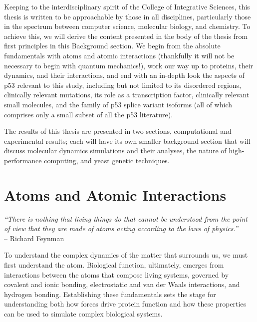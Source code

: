 Keeping to the interdisciplinary spirit of the College of Integrative Sciences, this thesis is written to be approachable by those in all disciplines, particularly those in the spectrum between computer science, molecular biology, and chemistry. To achieve this, we will derive the content presented in the body of the thesis from first principles in this Background section. We begin from the absolute fundamentals with atoms and atomic interactions (thankfully it will not be necessary to begin with quantum mechanics!), work our way up to proteins, their dynamics, and their interactions, and end with an in-depth look the aspects of p53 relevant to this study, including but not limited to its disordered regions, clinically relevant mutations, its role as a transcription factor, clinically relevant small molecules, and the family of p53 splice variant isoforms (all of which comprises only a small subset of all the p53 literature).

The results of this thesis are presented in two sections, computational and experimental results; each will have its own smaller background section that will discuss molecular dynamics simulations and their analyses, the nature of high-performance computing, and yeast genetic techniques.

\section{Atoms and Atomic Interactions}

\begin{flushright}
	\textit{“There is nothing that living things do that cannot be understood from the point of view that they are made of atoms acting according to the laws of physics.”}\\
– Richard Feynman\\
\hfill\break
\end{flushright}

To understand the complex dynamics of the matter that surrounds us, we must first understand the atom. Biological function, ultimately, emerges from interactions between the atoms that compose living systems, governed by covalent and ionic bonding, electrostatic and van der Waals interactions, and hydrogen bonding. Establishing these fundamentals sets the stage for understanding both how forces drive protein function and how these properties can be used to simulate complex biological systems.


